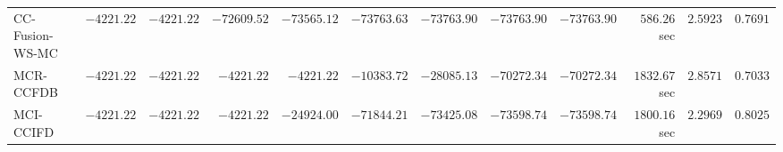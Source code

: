 \begin{table}[H]
\begin{tabular}{lrrrrrrrrrrr}
     CC-Fusion-WS-MC & $     -4221.22$ & $     -4221.22$ & $    -72609.52$ & $    -73565.12$ & $    -73763.63$ & $    -73763.90$ & $    -73763.90$ & $    -73763.90$ & $       586.26$ sec    & $       2.5923$  & $       0.7691$ \\ 
\cmidrule{1-1} 
           MCR-CCFDB & $     -4221.22$ & $     -4221.22$ & $     -4221.22$ & $     -4221.22$ & $    -10383.72$ & $    -28085.13$ & $    -70272.34$ & $    -70272.34$ & $      1832.67$ sec    & $       2.8571$  & $       0.7033$ \\ 
\cmidrule{1-1} 
           MCI-CCIFD & $     -4221.22$ & $     -4221.22$ & $     -4221.22$ & $    -24924.00$ & $    -71844.21$ & $    -73425.08$ & $    -73598.74$ & $    -73598.74$ & $      1800.16$ sec    & $       2.2969$  & $       0.8025$ \\ 
\bottomrule
\end{tabular}
\end{table}

